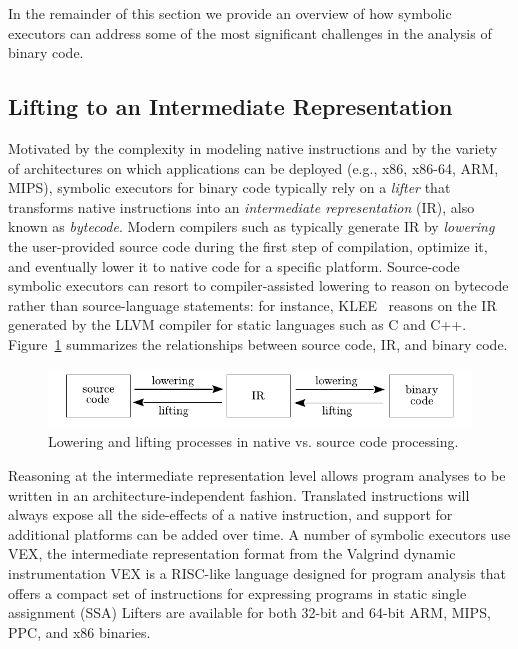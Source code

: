 In the remainder of this section we provide an overview of how symbolic executors can address some of the most significant challenges in the analysis of binary code.

\subsection{Lifting to an Intermediate Representation}
Motivated by the complexity in modeling native instructions and by the variety of architectures on which applications can be deployed (e.g., x86, x86-64, ARM, MIPS), symbolic executors for binary code typically rely on a {\em lifter} that transforms native instructions into an {\em intermediate representation} (IR), also known as {\em bytecode}. Modern compilers such as  typically generate IR by {\em lowering} the user-provided source code during the first step of compilation, optimize it, and eventually lower it to native code for a specific platform. Source-code symbolic executors can resort to compiler-assisted lowering to reason on bytecode rather than source-language statements: for instance, {\sc KLEE}~\cite{KLEE-OSDI08} reasons on the IR generated by the LLVM compiler for static languages such as C and C++. Figure~\ref{fig:lowering} summarizes the relationships between source code, IR, and binary code. %

\begin{figure}[t!]
  \centering
  \includegraphics[width=.66\columnwidth]{images/compiler} %
  \vspace{-2mm}
  \caption{\label{fig:lowering} Lowering and lifting processes in native vs. source code processing.}
  \vspace{-3pt} %
\end{figure}

Reasoning at the intermediate representation level allows program analyses to be written in an architecture-independent fashion. Translated instructions will always expose all the side-effects of a native instruction, and support for additional platforms can be added over time. A number of symbolic executors use VEX, the intermediate representation format from the Valgrind dynamic instrumentation  VEX is a RISC-like language designed for program analysis that offers a compact set of instructions for expressing programs in static single assignment (SSA)  Lifters are available for both 32-bit and 64-bit ARM, MIPS, PPC, and x86 binaries.

